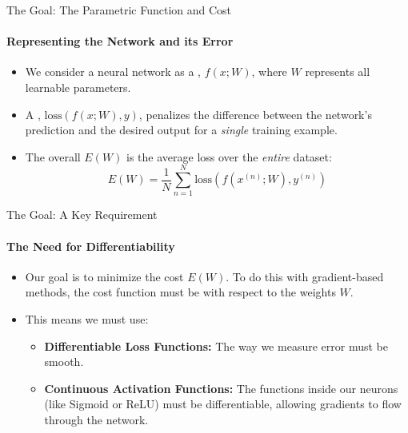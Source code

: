 \begin{frame}{The Goal: The Parametric Function and Cost} 
    \framesubtitle{Representing the Network and its Error}
    \begin{itemize}
        \item We consider a neural network as a , $f(x; W)$, where $W$ represents all learnable parameters.
        \item A , $\text{loss}(f(x;W), y)$, penalizes the difference between the network's prediction and the desired output for a \emph{single} training example.
        \item The overall  $E(W)$ is the average loss over the \emph{entire} dataset:
        \[
            E(W) = \frac{1}{N} \sum_{n=1}^{N} \text{loss}(f(x^{(n)}; W), y^{(n)})
        \]
    \end{itemize}
\end{frame}

\begin{frame}{The Goal: A Key Requirement}
    \framesubtitle{The Need for Differentiability}
    \begin{itemize}
        \item Our goal is to minimize the cost $E(W)$. To do this with gradient-based methods, the cost function must be  with respect to the weights $W$.
        \item This means we must use:
        \begin{itemize}
            \item \textbf{Differentiable Loss Functions:} The way we measure error must be smooth.
            \item \textbf{Continuous Activation Functions:} The functions inside our neurons (like Sigmoid or ReLU) must be differentiable, allowing gradients to flow through the network.
        \end{itemize}
    \end{itemize}
\end{frame}

